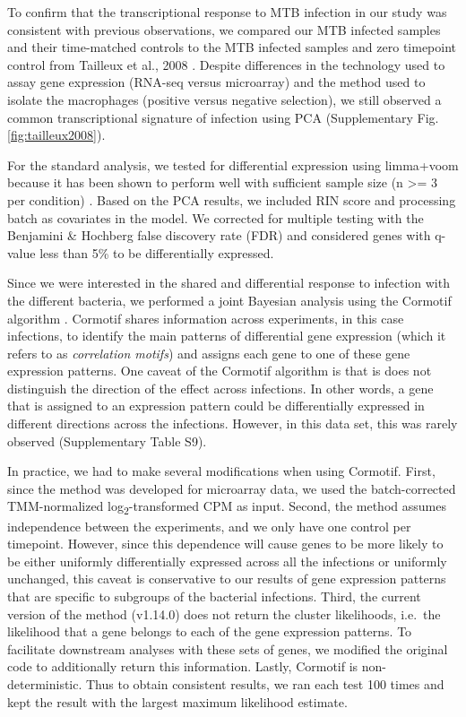 To confirm that the transcriptional response to MTB infection in our
study was consistent with previous observations, we compared our MTB
infected samples and their time-matched controls to the MTB infected
samples and zero timepoint control from Tailleux et al., 2008
\citep{Tailleux2008}. Despite differences in the technology used to assay
gene expression (RNA-seq versus microarray) and the method used to
isolate the macrophages (positive versus negative selection), we still
observed a common transcriptional signature of infection using PCA
(Supplementary Fig. \ref{fig:tailleux2008}).

For the standard analysis, we tested for differential expression using
limma+voom \citep{Smyth2004, Smyth2005, Law2014} because it has been
shown to perform well with sufficient sample size (n \textgreater{}= 3
per condition) \citep{Rapaport2013, Soneson2013}. Based on the PCA
results, we included RIN score and processing batch as covariates in the
model. We corrected for multiple testing with the Benjamini \& Hochberg
false discovery rate (FDR) \citep{Benjamini1995} and considered genes
with q-value less than 5\% to be differentially expressed.

Since we were interested in the shared and differential response to
infection with the different bacteria, we performed a joint Bayesian
analysis using the Cormotif algorithm \citep{Wei2015}. Cormotif shares
information across experiments, in this case infections, to identify the
main patterns of differential gene expression (which it refers to as
\emph{correlation motifs}) and assigns each gene to one of these gene
expression patterns. One caveat of the Cormotif algorithm is that is
does not distinguish the direction of the effect across infections. In
other words, a gene that is assigned to an expression pattern could be
differentially expressed in different directions across the infections.
However, in this data set, this was rarely observed (Supplementary Table
S9).

In practice, we had to make several modifications when using Cormotif.
First, since the method was developed for microarray data, we used the
batch-corrected TMM-normalized log\textsubscript{2}-transformed CPM as
input. Second, the method assumes independence between the experiments,
and we only have one control per timepoint. However, since this
dependence will cause genes to be more likely to be either uniformly
differentially expressed across all the infections or uniformly
unchanged, this caveat is conservative to our results of gene expression
patterns that are specific to subgroups of the bacterial infections.
Third, the current version of the method (v1.14.0) does not return the
cluster likelihoods, i.e.~the likelihood that a gene belongs to each of
the gene expression patterns. To facilitate downstream analyses with
these sets of genes, we modified the original code to additionally
return this information. Lastly, Cormotif is non-deterministic. Thus to
obtain consistent results, we ran each test 100 times and kept the
result with the largest maximum likelihood estimate.

